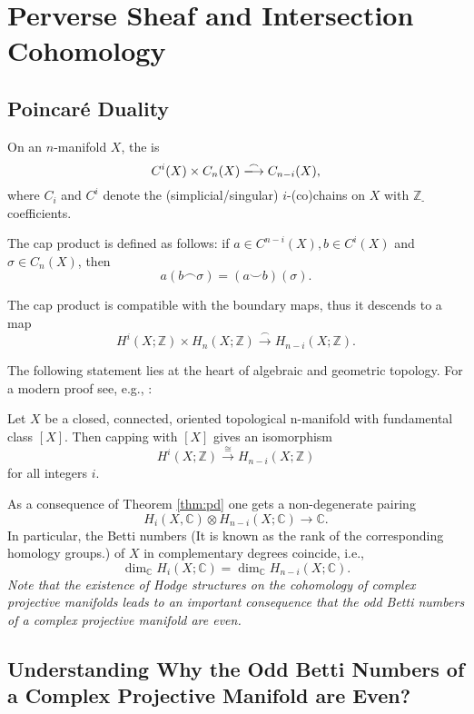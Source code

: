 \documentclass[lang=en,12pt]{beautybook}
\begin{document}
\section{Perverse Sheaf and Intersection Cohomology}

\subsection{Poincar\'e Duality}

\begin{definition}
    On an $n$-manifold $X$, the  is 
    \[C^i(X)\times C_n(X)\xlongrightarrow[]{\frown} C_{n-i}(X),\]
    where $C_i$ and $C^i$ denote the (simplicial/singular) $i$-(co)chains on $X$ with $\mathbb{Z}_{\text {- }}$ coefficients.
\end{definition}

The cap product is defined as follows: if $a \in C^{n-i}(X), b \in C^i(X)$ and $\sigma \in C_n(X)$, then
$$
a(b \frown \sigma)=(a \smile b)(\sigma).
$$

The cap product is compatible with the boundary maps, thus it descends to a map
$$
H^i(X ; \mathbb{Z}) \times H_n(X ; \mathbb{Z}) \xrightarrow{\frown} H_{n-i}(X ; \mathbb{Z}).
$$


The following statement lies at the heart of algebraic and geometric topology. For a modern proof see, e.g.,  \cite[Section 3.3]{hatcher2002algebraic}:
\begin{theorem}
    Let $X$ be a closed, connected, oriented topological n-manifold with fundamental class $[X]$. Then capping with $[X]$ gives an isomorphism
$$
H^i(X ; \mathbb{Z}) \xrightarrow{\cong} H_{n-i}(X ; \mathbb{Z})
$$
for all integers $i$.
\end{theorem}
    As a consequence of Theorem \ref{thm:pd} one gets a non-degenerate pairing
$$
H_i(X, \mathbb{C}) \otimes H_{n-i}(X ; \mathbb{C}) \longrightarrow \mathbb{C}.
$$
In particular, the Betti numbers (It is known as the rank of the corresponding homology groups.) of $X$ in complementary degrees coincide, i.e.,
$$
\operatorname{dim}_{\mathbb{C}} H_i(X ; \mathbb{C})=\operatorname{dim}_{\mathbb{C}} H_{n-i}(X ; \mathbb{C}).
$$
\textit{Note that the existence of Hodge structures on the cohomology of complex projective manifolds leads to an important consequence that the odd Betti numbers of a complex projective manifold are even. }


\subsection{Understanding Why the Odd Betti Numbers of a Complex Projective Manifold are Even?}
\end{document}
